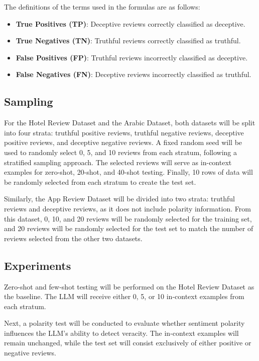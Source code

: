 \documentclass[sigconf, nonacm]{acmart}
\theoremstyle{definition}
\begin{document}
\noindent The definitions of the terms used in the formulas are as follows:
\begin{itemize}
  \item \textbf{True Positives (TP)}: Deceptive reviews correctly classified as deceptive.
  \item \textbf{True Negatives (TN)}: Truthful reviews correctly classified as truthful.
  \item \textbf{False Positives (FP)}: Truthful reviews incorrectly classified as deceptive.
  \item \textbf{False Negatives (FN)}: Deceptive reviews incorrectly classified as truthful.
\end{itemize}

\subsection{Sampling}
For the Hotel Review Dataset and the Arabic Dataset, both datasets will be split into four strata: truthful positive reviews, truthful negative reviews, deceptive positive reviews, and deceptive negative reviews. A fixed random seed will be used to randomly select 0, 5, and 10 reviews from each stratum, following a stratified sampling approach. The selected reviews will serve as in-context examples for zero-shot, 20-shot, and 40-shot testing. Finally, 10 rows of data will be randomly selected from each stratum to create the test set.

Similarly, the App Review Dataset will be divided into two strata: truthful reviews and deceptive reviews, as it does not include polarity information. From this dataset, 0, 10, and 20 reviews will be randomly selected for the training set, and 20 reviews will be randomly selected for the test set to match the number of reviews selected from the other two datasets.

\subsection{Experiments}

Zero-shot and few-shot testing will be performed on the Hotel Review Dataset as the baseline. The LLM will receive either 0, 5, or 10 in-context examples from each stratum.

Next, a polarity test will be conducted to evaluate whether sentiment polarity influences the LLM's ability to detect veracity. The in-context examples will remain unchanged, while the test set will consist exclusively of either positive or negative reviews.
\end{document}
